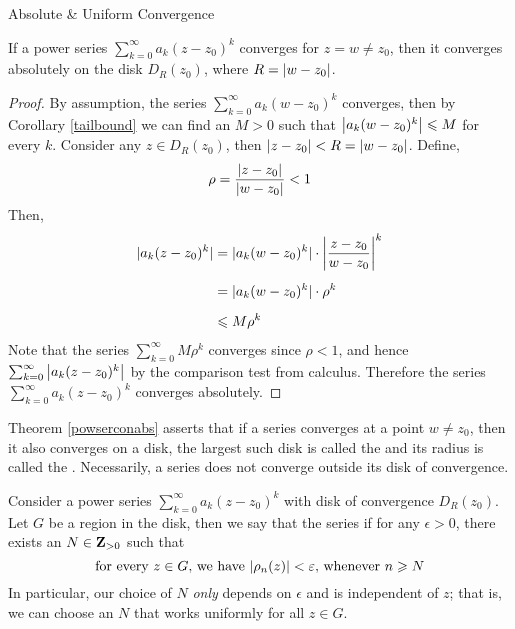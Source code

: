 \vspace*{1em}

\begin{mdframed}
\begin{center}
{\Large Absolute \& Uniform Convergence}
\end{center}
\end{mdframed}

\begin{theorem}\label{powserconabs}
If a power series $\sum_{k=0}^\infty a_k(z - z_0)^k$ converges for $z = w \neq z_0$, then it converges absolutely on the disk $D_R(z_0)$, where $R = \left\lvert w - z_0\right\rvert$.
\end{theorem}
\begin{proof}
By assumption, the series $\sum_{k=0}^\infty a_k(w - z_0)^k$ converges, then by Corollary \ref{tailbound} we can find an $M > 0$ such that $\left\lvert a_k(w - z_0)^k\right\rvert \leqslant M$ for every $k$. Consider any $z \in D_R(z_0)$, then $\left\lvert z - z_0\right\rvert < R = \left\lvert w - z_0\right\rvert$. Define,
\[\rho = \frac{\left\lvert z - z_0\right\rvert}{\left\lvert w - z_0\right\rvert} < 1\] 
Then,
\begin{align*}
|a_k(z - z_0)^k| &= |a_k(w - z_0)^k|\cdot\left\lvert\frac{z - z_0}{w - z_0}\right\rvert^k\\[0.5em]
&= |a_k(w - z_0)^k|\cdot\rho^k\\[0.5em]
&\leqslant M\rho^k
\end{align*}
Note that the series $\sum_{k=0}^\infty M\rho^k$ converges since $\rho < 1$, and hence $\sum_{k=0}^\infty\left\lvert a_k(z - z_0)^k\right\rvert$ by the comparison test from calculus. Therefore the series $\sum_{k=0}^\infty a_k(z - z_0)^k$ converges absolutely.
\end{proof}

\vspace*{1em}

\begin{remark}
Theorem \ref{powserconabs} asserts that if a series converges at a point $w \neq z_0$, then it also converges on a disk, the largest such disk is called the  and its radius is called the . Necessarily, a series does not converge outside its disk of convergence.
\end{remark}

\vspace*{1em}

\begin{definition}
Consider a power series $\sum_{k=0}^\infty a_k(z - z_0)^k$ with disk of convergence $D_R(z_0)$. Let $G$ be a region in the disk, then we say that the series  if for any $\epsilon > 0$, there exists an $N \in \mathbf Z_{>0}$ such that
\[\text{for every $z \in G$, we have $\left\lvert\rho_n(z)\right\rvert < \varepsilon$, whenever $n \geqslant N$}\]
In particular, our choice of $N$ \emph{only} depends on $\epsilon$ and is independent of $z$; that is, we can choose an $N$ that works uniformly for all $z \in G$.
\end{definition}

